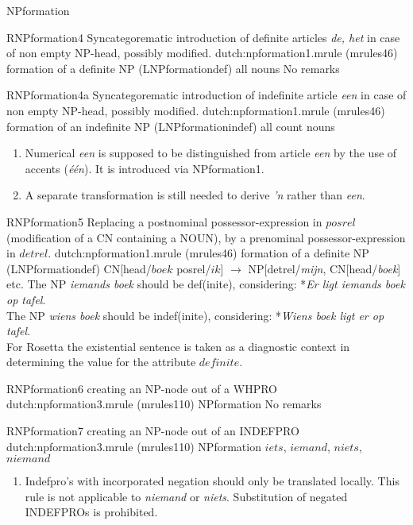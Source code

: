 \begin{mruleclass}{NPformation}
\begin{members}
\begin{member}
\end{member}
\begin{member}
 RNPformation4
Syncategorematic introduction of definite articles {\em de, het}
in case of non empty NP-head,
possibly  modified. 
\file dutch:npformation1.mrule (mrules46)
\semantics formation of a definite NP (LNPformationdef)
\example all nouns
\remarks No remarks
\end{member}
\begin{member}
 RNPformation4a
Syncategorematic introduction of indefinite article {\em een} 
in case of non empty NP-head,
possibly  modified. 
\file dutch:npformation1.mrule (mrules46)
\semantics formation of an indefinite NP  (LNPformationindef)
\example all count nouns
\remarks 
\begin{enumerate}
  \item
Numerical {\em een} is supposed to be distinguished from article {\em een}
by the use of accents ({\em \'{e}\'{e}n}). It is introduced via NPformation1.
  \item
A separate transformation is still needed to derive {\em 'n} rather 
than {\em een}.
\end{enumerate}

\end{member}
\begin{member}
 RNPformation5
 Replacing a postnominal possessor-expression in $posrel$ (modification of a CN 
containing a NOUN), by a prenominal possessor-expression in $detrel$. 
\file dutch:npformation1.mrule (mrules46)
\semantics formation of a definite NP (LNPformationdef)
\example 
CN[head/$boek$ posrel/$ik$] $\rightarrow$ 
NP[detrel/{\em mijn}, CN[head/{\em boek}] etc.
\remarks\mbox{}
The NP {\em iemands boek} should be def(inite), considering:
*{\em Er ligt iemands boek op tafel}.\\
The NP {\em wiens boek} should be indef(inite), considering:
*{\em Wiens boek ligt er op tafel}.\\
For Rosetta the existential sentence is taken as a diagnostic context 
in determining the value for the attribute $definite$.
\end{member}
\begin{member}
 RNPformation6
 creating an NP-node out of a WHPRO
\file dutch:npformation3.mrule (mrules110)
\semantics NPformation
\remarks No remarks
\end{member}
\begin{member}
 RNPformation7
 creating an NP-node out of an INDEFPRO
\file dutch:npformation3.mrule (mrules110)
\semantics NPformation
\example $iets$, $iemand$, $niets$, $niemand$
\remarks
\begin{enumerate}
\item  Indefpro's with incorporated negation should only be translated locally.
This rule is not applicable to {\em niemand} or {\em niets}. Substitution of 
negated INDEFPROs is prohibited.
\end{enumerate}


\end{member}
\end{members}
\end{mruleclass}
